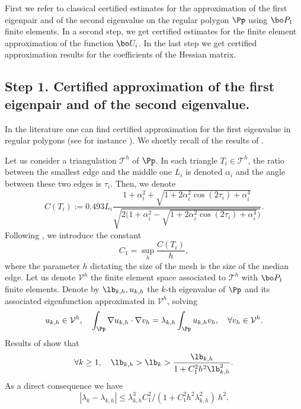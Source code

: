 First we refer to classical certified estimates for the approximation of the first eigenpair and of the second eigenvalue on the regular polygon $\Pp$ using $\bo P_1$ finite elements. In a second step, we get certified estimates for the finite element approximation of the function $\bo U_i$. In the last step we get certified approximation results for the coefficients of the Hessian matrix.

\subsection{Step 1. Certified approximation of the first eigenpair and of the second eigenvalue.}
\label{sec:eig-estimates}

In the literature one can find certified approximation for the first eigenvalue in regular polygons (see for instance \cite{Jo17}). We shortly recall of the results of \cite[Th.\,4.3]{LiOi13}.

Let us consider a triangulation ${\mathcal T}^h$ of $\Pp$. In each triangle $T_i\in {\mathcal T}^h$, the ratio between the smallest edge and the middle one $L_i$ is denoted $\alpha_i$ and the angle between these two edges is $\tau_i$. Then, we denote
\[
C(T_i):= 0.493 L_i\frac{1+ \alpha_i^2+\sqrt{1+2 \alpha_i^2 \cos(2\tau_i) + \alpha_i^4}}{\sqrt{2\Big (1+ \alpha_i^2-\sqrt{1+2 \alpha_i^2 \cos(2\tau_i) + \alpha_i^4}\Big)}}.
\]
Following \cite[\S 2]{LiOi13}, we introduce the constant
\begin{equation}\label{eq:C1}
C_1= \sup_h \frac{C(T_i)}{h},
\end{equation}
where the parameter $h$ dictating the size of the mesh is the size of the median edge.
Let us denote $\mathcal V^h$ the finite element space associated to ${\mathcal T}^h$ with $\bo P_1$ finite elements. Denote by $\lb_{k,h}, u_{k,h}$ the $k$-th eigenvalue of $\Pp$ and its associated eigenfunction approximated in $\mathcal V^h$, solving
\begin{equation}
u_{k,h} \in \mathcal V^h,\quad \int_\Pp \nabla u_{k,h}\cdot \nabla v_h = \lambda_{k,h}\int_\Pp u_{k,h} v_h, \ \ \ \forall v_h \in \mathcal V^h.
\label{eq:eigenvalue-finite-elements}
\end{equation}
Results of \cite{LiOi13} show that
\[
\forall k \ge 1, \quad \lb_{k,h} > \lb_k> \frac{\lb_{k,h}}{1+ C_1^2 h^2 \lb_{k,h}^2}.
\]
As a direct consequence we have
\begin{equation}
|\lambda_k-\lambda_{k,h}| \leq \lambda_{k,h}^3 C_1^2/(1+C_1^2h^2\lambda_{k,h}^2)\ h^2.
\label{eq:difflam}
\end{equation}

